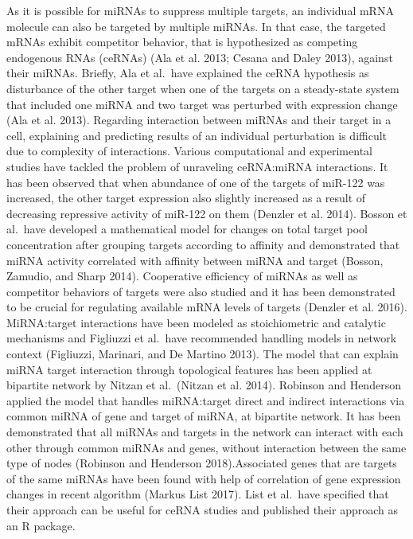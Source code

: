 \documentclass[]{article}
\begin{document}
As it is possible for miRNAs to suppress multiple targets, an individual
mRNA molecule can also be targeted by multiple miRNAs. In that case, the
targeted mRNAs exhibit competitor behavior, that is hypothesized as
competing endogenous RNAs (ceRNAs) (Ala et al. 2013; Cesana and Daley
2013), against their miRNAs. Briefly, Ala et al.~have explained the
ceRNA hypothesis as disturbance of the other target when one of the
targets on a steady-state system that included one miRNA and two target
was perturbed with expression change (Ala et al. 2013). Regarding
interaction between miRNAs and their target in a cell, explaining and
predicting results of an individual perturbation is difficult due to
complexity of interactions. Various computational and experimental
studies have tackled the problem of unraveling ceRNA:miRNA interactions.
It has been observed that when abundance of one of the targets of
miR-122 was increased, the other target expression also slightly
increased as a result of decreasing repressive activity of miR-122 on
them (Denzler et al. 2014). Bosson et al.~have developed a mathematical
model for changes on total target pool concentration after grouping
targets according to affinity and demonstrated that miRNA activity
correlated with affinity between miRNA and target (Bosson, Zamudio, and
Sharp 2014). Cooperative efficiency of miRNAs as well as competitor
behaviors of targets were also studied and it has been demonstrated to
be crucial for regulating available mRNA levels of targets (Denzler et
al. 2016). MiRNA:target interactions have been modeled as stoichiometric
and catalytic mechanisms and Figliuzzi et al.~have recommended handling
models in network context (Figliuzzi, Marinari, and De Martino 2013).
The model that can explain miRNA target interaction through topological
features has been applied at bipartite network by Nitzan et al.~(Nitzan
et al. 2014). Robinson and Henderson applied the model that handles
miRNA:target direct and indirect interactions via common miRNA of gene
and target of miRNA, at bipartite network. It has been demonstrated that
all miRNAs and targets in the network can interact with each other
through common miRNAs and genes, without interaction between the same
type of nodes (Robinson and Henderson 2018).Associated genes that are
targets of the same miRNAs have been found with help of correlation of
gene expression changes in recent algorithm (Markus List 2017). List et
al.~have specified that their approach can be useful for ceRNA studies
and published their approach as an R package.
\end{document}
